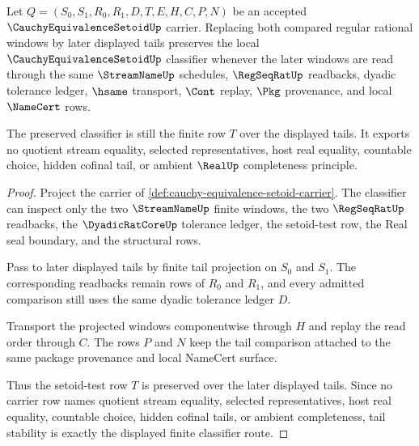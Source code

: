 \begin{theorem}
\label{thm:cauchy-equivalence-setoid-tail-stability}
Let $Q=(S_0,S_1,R_0,R_1,D,T,E,H,C,P,N)$ be an accepted $\CauchyEquivalenceSetoidUp$ carrier. Replacing both compared regular rational windows by later displayed tails preserves the local $\CauchyEquivalenceSetoidUp$ classifier whenever the later windows are read through the same $\StreamNameUp$ schedules, $\RegSeqRatUp$ readbacks, dyadic tolerance ledger, $\hsame$ transport, $\Cont$ replay, $\Pkg$ provenance, and local $\NameCert$ rows.

The preserved classifier is still the finite row $T$ over the displayed tails. It exports no quotient stream equality, selected representatives, host real equality, countable choice, hidden cofinal tail, or ambient $\RealUp$ completeness principle.
\end{theorem}
\begin{proof}
Project the carrier of \autoref{def:cauchy-equivalence-setoid-carrier}. The classifier can inspect only the two $\StreamNameUp$ finite windows, the two $\RegSeqRatUp$ readbacks, the $\DyadicRatCoreUp$ tolerance ledger, the setoid-test row, the Real seal boundary, and the structural rows.

Pass to later displayed tails by finite tail projection on $S_0$ and $S_1$. The corresponding readbacks remain rows of $R_0$ and $R_1$, and every admitted comparison still uses the same dyadic tolerance ledger $D$.

Transport the projected windows componentwise through $H$ and replay the read order through $C$. The rows $P$ and $N$ keep the tail comparison attached to the same package provenance and local NameCert surface.

Thus the setoid-test row $T$ is preserved over the later displayed tails. Since no carrier row names quotient stream equality, selected representatives, host real equality, countable choice, hidden cofinal tails, or ambient completeness, tail stability is exactly the displayed finite classifier route.
\end{proof}
